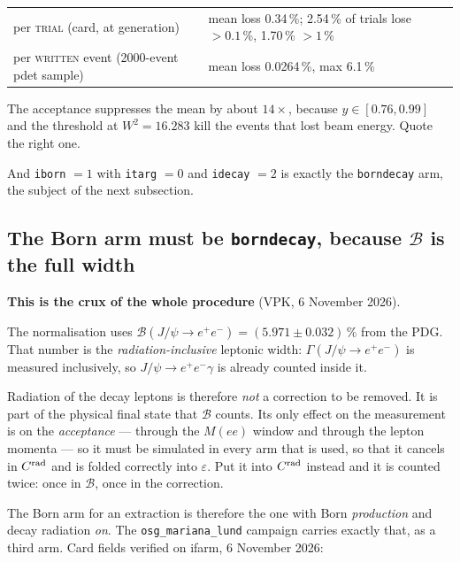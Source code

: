 \documentclass[11pt]{article}
\newcommand{\crad}{C^{\rm rad}}
\newcommand{\BR}{\mathcal{B}}
\begin{document}
\begin{center}\small
\begin{tabular}{ll}
\toprule
per \textsc{trial} (card, at generation) & mean loss 0.34\,\%; 2.54\,\% of trials lose $>0.1$\,\%, 1.70\,\% $>1$\,\% \\
per \textsc{written} event (2000-event pdet sample) & mean loss 0.0264\,\%, max 6.1\,\% \\
\bottomrule
\end{tabular}
\end{center}

\noindent The acceptance suppresses the mean by about $14\times$, because $y\in[0.76,0.99]$ and the
threshold at $W^2=16.283$ kill the events that lost beam energy. Quote the right one.

And \texttt{iborn} $=1$ with \texttt{itarg} $=0$ and \texttt{idecay} $=2$ is exactly the
\texttt{borndecay} arm, the subject of the next subsection.

\subsection{The Born arm must be \texttt{borndecay}, because \texorpdfstring{$\BR$}{BR} is the full width}

\textbf{This is the crux of the whole procedure} (VPK, 6 November 2026).

The normalisation uses $\BR(J/\psi\to e^+e^-)=(5.971\pm0.032)\,\%$ from the PDG. That number is the
\emph{radiation-inclusive} leptonic width: $\Gamma(J/\psi\to e^+e^-)$ is measured inclusively, so
$J/\psi\to e^+e^-\gamma$ is already counted inside it.

Radiation of the decay leptons is therefore \emph{not} a correction to be removed. It is part of the
physical final state that $\BR$ counts. Its only effect on the measurement is on the
\emph{acceptance} --- through the $M(ee)$ window and through the lepton momenta --- so it must be
simulated in every arm that is used, so that it cancels in $\crad$ and is folded correctly into
$\varepsilon$. Put it into $\crad$ instead and it is counted twice: once in $\BR$, once in the
correction.

The Born arm for an extraction is therefore the one with Born \emph{production} and decay radiation
\emph{on}. The \texttt{osg\_mariana\_lund} campaign carries exactly that, as a third arm. Card
fields verified on ifarm, 6 November 2026:
\end{document}
